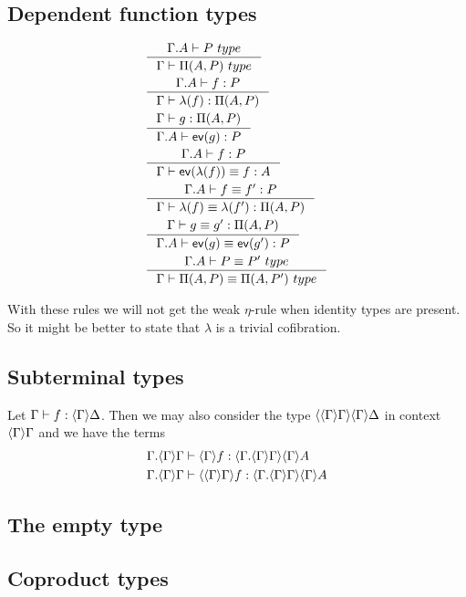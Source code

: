 \subsection{Dependent function types}
\begin{align}
& \inference{\jtype{\ctxext{\Gamma}{A}}{P}}{\jtype{\Gamma}{\mprd{A}{P}}}\\
& \inference{\jterm{\ctxext{\Gamma}{A}}{P}{f}}{\jterm{\Gamma}{\mprd{A}{P}}{\lambda(f)}}\\
& \inference{\jterm{\Gamma}{\mprd{A}{P}}{g}}{\jterm{\ctxext{\Gamma}{A}}{P}{\tfev(g)}}\\
& \inference{\jterm{\ctxext{\Gamma}{A}}{P}{f}}{\jtermeq{\Gamma}{A}{\tfev(\lambda(f))}{f}}\\
& \inference{\jtermeq{\ctxext{\Gamma}{A}}{P}{f}{f'}}{\jtermeq{\Gamma}{\mprd{A}{P}}{\lambda(f)}{\lambda(f')}}\\
& \inference{\jtermeq{\Gamma}{\mprd{A}{P}}{g}{g'}}{\jtermeq{\ctxext{\Gamma}{A}}{P}{\tfev(g)}{\tfev(g')}}\\
& \inference{\jtypeeq{\ctxext{\Gamma}{A}}{P}{P'}}{\jtypeeq{\Gamma}{\mprd{A}{P}}{\mprd{A}{P'}}}\\
\end{align}

With these rules we will not get the weak $\eta$-rule when identity types are present.
So it might be better to state that $\lambda$ is a trivial cofibration.

\subsection{Subterminal types}
Let $\jhom{\Gamma}{\Delta}{f}$. Then we may also consider the type $\ctxwk{{\Gamma}{\Gamma}}{{\Gamma}{\Delta}}$
in context $\ctxwk{\Gamma}{\Gamma}$ and we have the terms
\begin{align*}
& \jhom{\ctxext{\Gamma}{\ctxwk{\Gamma}{\Gamma}}}{\ctxwk{\Gamma}{A}}{\ctxwk{\Gamma}{f}}\\
& \jhom{\ctxext{\Gamma}{\ctxwk{\Gamma}{\Gamma}}}{\ctxwk{\Gamma}{A}}{\ctxwk{{\Gamma}{\Gamma}}{f}}
\end{align*}

\subsection{The empty type}

\subsection{Coproduct types}


